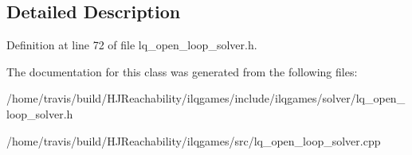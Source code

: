 \subsection{Detailed Description}


Definition at line 72 of file lq\+\_\+open\+\_\+loop\+\_\+solver.\+h.



The documentation for this class was generated from the following files\+:\begin{DoxyCompactItemize}
\item 
/home/travis/build/\+H\+J\+Reachability/ilqgames/include/ilqgames/solver/lq\+\_\+open\+\_\+loop\+\_\+solver.\+h\item 
/home/travis/build/\+H\+J\+Reachability/ilqgames/src/lq\+\_\+open\+\_\+loop\+\_\+solver.\+cpp\end{DoxyCompactItemize}
